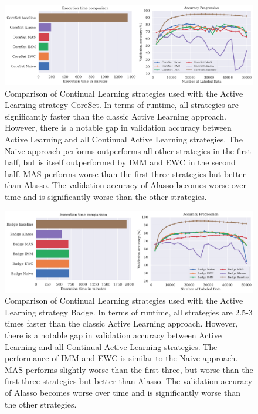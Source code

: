 \begin{figure} [ht]
    \centering
    \includegraphics[width=\linewidth]{images/results_CAL/CoreSet_CAL_2000b.png}
    \caption[Continual Active Learning CoreSet 2000 batch size]{Comparison of Continual Learning strategies used with the Active Learning strategy CoreSet. In terms of runtime, all
    strategies are significantly faster than the classic Active Learning approach. However, there is a notable gap in validation accuracy between Active Learning and all Continual
    Active Learning strategies. The Naive approach performs outperforms all other strategies in the first half, but is itself outperformed by IMM and EWC in the second half. MAS performs
    worse than the first three strategies but better than Alasso. The validation accuracy of Alasso becomes worse over time and is significantly worse than the other strategies.}
    \label{fig:Evaluation:Results:CAL:CoreSet2000}
\end{figure}

\begin{figure} [ht]
    \centering
    \includegraphics[width=\linewidth]{images/results_CAL/Badge_CAL_2000b.png}
    \caption[Continual Active Learning Badge 2000 batch size]{Comparison of Continual Learning strategies used with the Active Learning strategy Badge. In terms of runtime, all
    strategies are 2.5-3 times faster than the classic Active Learning approach. However, there is a notable gap in validation accuracy between Active Learning and all Continual
    Active Learning strategies. The performance of IMM and EWC is similar to the Naive approach. MAS performs slightly worse than the first three, but 
    worse than the first three strategies but better than Alasso. The validation accuracy of Alasso becomes worse over time and is significantly worse than the other strategies.}
    \label{fig:Evaluation:Results:CAL:Badge2000}
\end{figure}






